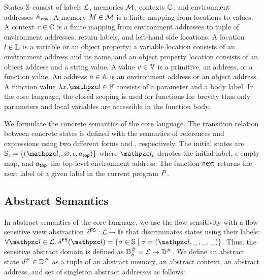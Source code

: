 States $\mathbb{S}$ consist of labels $\mathcal{L}$, memories $\mathcal{M}$, contexts
$\mathbb{C}$, and environment addresses $\mathbb{A}_{\textsf{env}}$.  A memory $M \in \mathcal{M}$
is a finite mapping from locations to values.  A context $c \in \mathbb{C}$ is
a finite mapping from environment addresses to tuple of environment addresses,
return labels, and left-hand side locations.  A location $l \in \mathbb{L}$ is a
variable or an object property; a variable location consists of an environment
address and its name, and an object property location consists of an object
address and a string value.  A value $v \in \mathbb{V}$ is a primitive, an
address, or a function value.  An address $a \in \mathbb{A}$ is an environment
address or an object address.  A function value $\fval{x}{\lab} \in \fvalset$
consists of a parameter and a body label.  In the core language, the closed
scoping is used for functions for brevity thus only parameters and local
variables are accessible in the function body.

We formulate the concrete semantics of the core language.  The transition
relation between concrete states is defined with the semantics of references and
expressions using two different forms  and
\fbox{$\exprrule{\st}{\expr}{\val}$}, respectively.  The initial states are
$\istset = \{ (\ilab, \varnothing, \epsilon, \tladdr) \}$ where $\ilab$ denotes
the initial label, $\epsilon$ empty map, and $a_{\textsf{top}}$ the top-level environment
address.  The function $\textsf{next}$ returns the next label of a given label in the
current program $P$.


\subsection{Abstract Semantics}

In abstract semantics of the core language, we use the flow sensitivity with a
flow sensitive view abstraction $\delta^{\textsf{FS}}: \mathcal{L} \rightarrow \mathbb{D}$ that
discriminates states using their labels: $\forall \lab \in \labset. \;
\fsviewmap(\lab) = \{ \st \in \stset \mid \st = (\lab, \_, \_, \_) \}$. Thus, the
sensitive abstract domain is defined as ${\mathbb{D}}^{\#}_\delta = \mathcal{L} \rightarrow
{\mathbb{D}}^{\#}$.  We define an abstract state ${d}^{\#} \in {\mathbb{D}}^{\#}$ as a tuple of an
abstract memory, an abstract context, an abstract address, and set of singleton
abstract addresses as follows:

